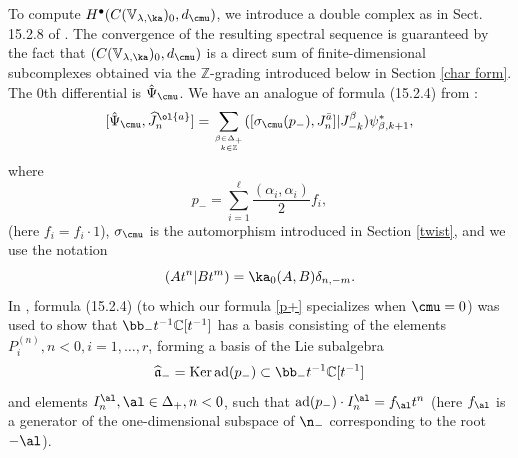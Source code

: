 \documentclass{amsart}
\newcommand{\wh}{\widehat}
\newcommand{\on}{\operatorname}
\newcommand{\+}{\mathop{\oplus}}
\renewcommand{\*}{{\otimes}}
\newcommand{\mb}{\mathbb}
\newcommand{\Z}{\mathbb{Z}}
\newcommand{\C}{\mathbb{C}}
\newcommand{\lam}{\lambda}
\theoremstyle{theorem}
\theoremstyle{remark}
\numberwithin{equation}{section}
\begin{document}
To compute $H^\bullet(C({\mb V}_{\lam,\ka})_0,d_\cmu)$, we introduce a
double complex as in Sect. 15.2.8 of \cite{FreBen04}. The convergence
of the resulting spectral sequence is guaranteed by the fact that
$(C({\mb V}_{\lam,\ka})_0,d_\cmu)$ is a direct sum of
finite-dimensional subcomplexes obtained via the $\Z$-grading
introduced below in Section \ref{char form}. The $0$th differential is
$\hat{\Psi}_{\cmu}$. We have an analogue of formula (15.2.4) from
\cite{FreBen04}:
\begin{equation}    \label{p+}
[\hat{\Psi}_{\cmu},\wh{J}^{\ol{a}}_n] = \sum_{\beta\in \Delta_+\atop
  k\in \Z} ([\sigma_{\cmu}(p_-),J^{\bar a}_n]| J^\beta_{-k})\psi_{\beta,k+1}^*,
\end{equation}
where 
$$
p_-=\sum_{i=1}^{\ell}\frac{(\alpha_i,\alpha_i)}{2} f_i, %
$$
(here $f_i=f_i \cdot 1$), $\sigma_\cmu$ is the automorphism introduced
in Section \ref{twist}, and we use the notation
$$
(A t^n|B t^m) = \ka_0(A,B) \delta_{n,-m}.
$$
In \cite{FreBen04}, formula (15.2.4) (to which our formula \eqref{p+}
specializes when $\cmu=0$) was used to show that $\bb_- t^{-1}
\C[t^{-1}]$ has a basis consisting of the elements $P_i^{(n)}, n<0,
i=1,\ldots,r$, forming a basis of the Lie subalgebra
$$
\wh{\mathfrak a}_- = \on{Ker}
\on{ad}(p_-) \subset \bb_- t^{-1} \C[t^{-1}]
$$
and elements $I^\al_n, \al \in \Delta_+, n<0$, such that $\on{ad}(p_-)
\cdot I^\al_n = f_\al t^n$ (here $f_\al$ is a generator of the
one-dimensional subspace of $\n_-$ corresponding to the root $-\al$).
\end{document}
